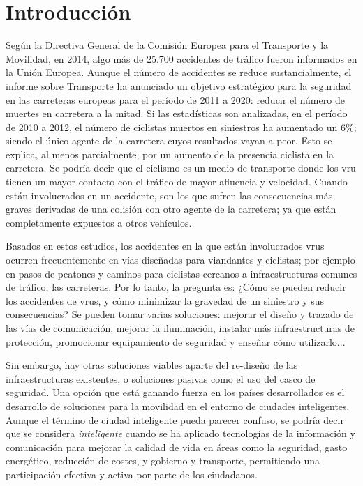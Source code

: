 \chapter{Introducción}
Según la Directiva General de la Comisión Europea para el Transporte y la Movilidad,
en 2014, algo más de 25.700 accidentes de tráfico fueron informados en la Unión
Europea. Aunque el número de accidentes se reduce sustancialmente, el informe sobre
Transporte ha anunciado un objetivo estratégico para la seguridad en las carreteras
europeas para el período de 2011 a 2020: reducir el número de muertes en carretera a
la mitad. Si las estadísticas son analizadas, en el período de 2010 a 2012, el número
de ciclistas muertos en siniestros ha aumentado un 6\%; siendo el único agente de la
carretera cuyos resultados vayan a peor. Esto se explica, al menos parcialmente, por un
aumento de la presencia ciclista en la carretera. Se podría decir que el ciclismo es un
medio de transporte donde los \gls{vru} tienen un mayor contacto con el tráfico de
mayor afluencia y velocidad. Cuando están involucrados en un accidente, son los que sufren
las consecuencias más graves derivadas de una colisión con otro agente de la carretera; ya
que están completamente expuestos a otros vehículos.

Basados en estos estudios, los accidentes en la que están involucrados \gls{vru}s ocurren
frecuentemente en vías diseñadas para viandantes y ciclistas; por ejemplo en pasos de
peatones y caminos para ciclistas cercanos a infraestructuras comunes de tráfico, las
carreteras. Por lo tanto, la pregunta es: ¿Cómo se pueden reducir los accidentes de 
\gls{vru}s, y cómo minimizar la gravedad de un siniestro y sus consecuencias? Se pueden tomar
varias soluciones: mejorar el diseño y trazado de las vías de comunicación, mejorar la
iluminación, instalar más infraestructuras de protección, promocionar equipamiento de seguridad
y enseñar cómo utilizarlo...

Sin embargo, hay otras soluciones viables aparte del re-diseño de las infraestructuras
existentes, o soluciones pasivas como el uso del casco de seguridad. Una opción que está
ganando fuerza en los países desarrollados es el desarrollo de soluciones para la movilidad
en el entorno de ciudades inteligentes. Aunque el término de ciudad inteligente pueda parecer
confuso, se podría decir que se considera \emph{inteligente} cuando se ha aplicado tecnologías
de la información y comunicación para mejorar la calidad de vida en áreas como la seguridad,
gasto energético, reducción de costes, y gobierno y transporte, permitiendo una participación
efectiva y activa por parte de los ciudadanos.

